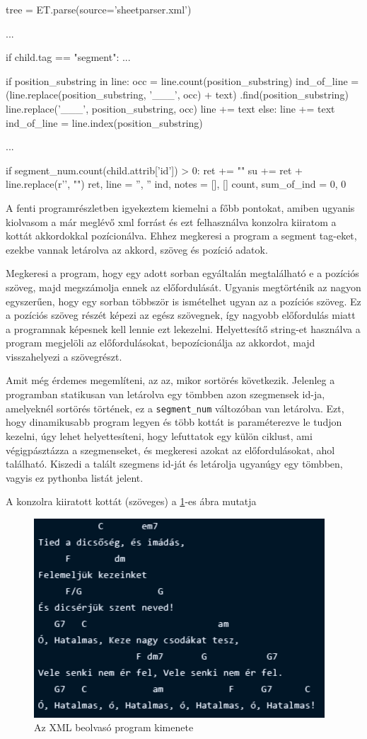 \begin{python}
tree = ET.parse(source='sheetparser.xml')

...

if child.tag == "segment":
	...
	
  if position_substring in line:
    occ = line.count(position_substring)
    ind_of_line = (line.replace(position_substring, '___', occ) + text)
      .find(position_substring)
    line.replace('___', position_substring, occ)
    line += text
  else:
    line += text
    ind_of_line = line.index(position_substring)
	            
     ...
     
  if segment_num.count(child.attrib['id']) > 0:
    ret += "\n"
    su += ret + line.replace(r'\n', "\n")
    ret, line = '', ''
    ind, notes = [], []
    count, sum_of_ind = 0, 0
\end{python}

A fenti programrészletben igyekeztem kiemelni a főbb pontokat, amiben ugyanis kiolvasom a már meglévő xml forrást és ezt felhasználva konzolra kiiratom a kottát akkordokkal pozícionálva. Ehhez megkeresi a program a segment tag-eket, ezekbe vannak letárolva az akkord, szöveg és pozíció adatok. 

Megkeresi a program, hogy egy adott sorban egyáltalán megtalálható e a pozíciós szöveg, majd megszámolja ennek az előfordulását. Ugyanis megtörténik az nagyon egyszerűen, hogy egy sorban többször is ismételhet ugyan az a pozíciós szöveg. Ez a pozíciós szöveg részét képezi az egész szövegnek, így nagyobb előfordulás miatt a programnak képesnek kell lennie ezt lekezelni. Helyettesítő string-et használva a program megjelöli az előfordulásokat, bepozícionálja az akkordot, majd visszahelyezi a szövegrészt.

Amit még érdemes megemlíteni, az az, mikor sortörés következik. Jelenleg a programban statikusan van letárolva egy tömbben azon szegmensek id-ja, amelyeknél sortörés történek, ez a \texttt{segment\_num} változóban van letárolva. Ezt, hogy dinamikusabb program legyen és több kottát is paraméterezve le tudjon kezelni, úgy lehet helyettesíteni, hogy lefuttatok egy külön ciklust, ami végigpásztázza a szegmenseket, és megkeresi azokat az előfordulásokat, ahol \texttt{} található. Kiszedi a talált szegmens id-ját és letárolja ugyanúgy egy tömbben, vagyis ez pythonba listát jelent.

A konzolra kiiratott kottát (szöveges) a \ref{fig:output1}-es ábra mutatja

\begin{figure}[h]
	\centering
	\includegraphics[scale=1]{images/output_tied.png}
	\caption{Az XML beolvasó program kimenete}
	\label{fig:output1}
\end{figure}

